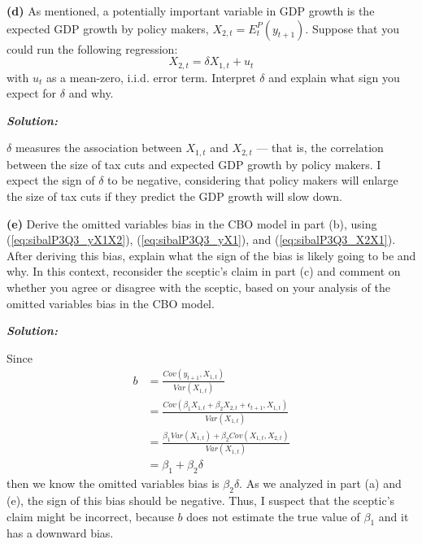 \documentclass[12pt, letterpaper]{article}
\begin{document}
\vspace{1em}
\noindent\textbf{(d)} As mentioned, a potentially important variable in GDP growth is the expected GDP growth by policy makers, $X_{2,t} = E_t^P(y_{t+1})$. Suppose that you could run the following regression:
\begin{equation}
    \label{eq:sibalP3Q3_X2X1}
    X_{2,t} = \delta X_{1,t} + u_t
\end{equation}
with $u_t$ as a mean-zero, i.i.d. error term. Interpret $\delta$ and explain what sign you expect for $\delta$ and why.

\begin{shaded}
\noindent\textbf{\textit{Solution:}}\par
$\delta$ measures the association between $X_{1,t}$ and $X_{2,t}$ --- that is, the correlation between the size of tax cuts and expected GDP growth by policy makers. I expect the sign of $\delta$ to be negative, considering that policy makers will enlarge the size of tax cuts if they predict the GDP growth will slow down.
\end{shaded}


\vspace{1em}
\noindent\textbf{(e)} Derive the omitted variables bias in the CBO model in part (b), using (\ref{eq:sibalP3Q3_yX1X2}), (\ref{eq:sibalP3Q3_yX1}), and (\ref{eq:sibalP3Q3_X2X1}). After deriving this bias, explain what the sign of the bias is likely going to be and why. In this context, reconsider the sceptic's claim in part (c) and comment on whether you agree or disagree with the sceptic, based on your analysis of the omitted variables bias in the CBO model.

\begin{shaded}
\noindent\textbf{\textit{Solution:}}\par
Since
\begin{align*}
    b & = \frac{Cov(y_{t+1}, X_{1,t})}{Var(X_{1,t})} \\[5pt]
    & = \frac{Cov(\beta_1 X_{1,t} + \beta_2 X_{2,t} + \epsilon_{t+1}, X_{1,t})}{Var(X_{1,t})} \\[5pt]
    & = \frac{\beta_1 Var(X_{1,t}) + \beta_2 Cov(X_{1,t}, X_{2,t})}{Var(X_{1,t})} \\[5pt]
    & = \beta_1 + \beta_2 \delta
\end{align*}
then we know the omitted variables bias is $\beta_2 \delta$. As we analyzed in part (a) and (e), the sign of this bias should be negative. Thus, I suspect that the sceptic's claim might be incorrect, because $b$ does not estimate the true value of $\beta_1$ and it has a downward bias.
\end{shaded}
\end{document}
